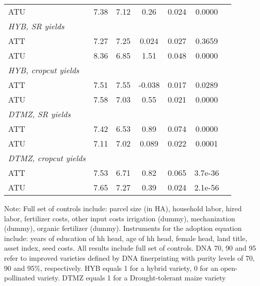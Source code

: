 \begin{table}[H]
\begin{threeparttable}
\begin{tabular}{l cccccc}
%
%
%
ATU         &        7.38&        7.12&        0.26&       0.024&      0.0000\\
%
%
%
\textit{HYB, SR yields}&            &            &            &            &            \\
ATT         &        7.27&        7.25&       0.024&       0.027&      0.3659\\
%
%
%
ATU         &        8.36&        6.85&        1.51&       0.048&      0.0000\\
%
%
%
\textit{HYB, cropcut yields}&            &            &            &            &            \\
ATT         &        7.51&        7.55&      -0.038&       0.017&      0.0289\\
%
%
%
ATU         &        7.58&        7.03&        0.55&       0.021&      0.0000\\
%
%
%
\textit{DTMZ, SR yields}&            &            &            &            &            \\
ATT         &        7.42&        6.53&        0.89&       0.074&      0.0000\\
%
%
%
ATU         &        7.11&        7.02&       0.089&       0.022&      0.0001\\
%
%
%
\textit{DTMZ, cropcut yields}&            &            &            &            &            \\
ATT         &        7.53&        6.71&        0.82&       0.065&     3.7e-36\\
%
%
%
ATU         &        7.65&        7.27&        0.39&       0.024&     2.1e-56\\
\hline
\hline
\end{tabular}
\begin{tablenotes}
\footnotesize
\item{Note: Full set of controls include: parcel size (in HA), household labor, hired labor, fertilizer costs, other input costs irrigation (dummy), mechanization (dummy), organic fertilizer (dummy). Instruments for the adoption equation include: years of education of hh head, age of hh head, female head, land title, asset index, seed costs. All results include full set of controls. DNA 70, 90 and 95 refer to improved varieties defined by DNA finerprinting with purity levels of 70, 90 and 95\%, respectively. HYB equals 1 for a hybrid variety, 0 for an open-pollinated variety. DTMZ equals 1 for a Drought-tolerant maize variety}
\end{tablenotes}
\end{threeparttable}
\end{table}
